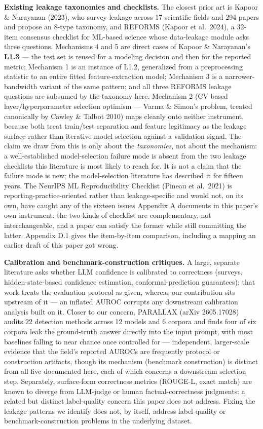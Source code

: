 \documentclass[10pt]{article} %
\begin{document}
\textbf{Existing leakage taxonomies and checklists.} The closest prior art is
Kapoor \& Narayanan (2023), who survey leakage across 17 scientific fields and
294 papers and propose an 8-type taxonomy, and REFORMS (Kapoor et al.\ 2024), a
32-item consensus checklist for ML-based science whose data-leakage module asks
three questions. Mechanisms 4 and 5 are direct cases of Kapoor \& Narayanan's
\textbf{L1.3} --- the test set is reused for a modeling decision and then for
the reported metric; Mechanism 1 is an instance of L1.2, generalized from a
preprocessing statistic to an entire fitted feature-extraction model; Mechanism
3 is a narrower-bandwidth variant of the same pattern; and all three REFORMS
leakage questions are subsumed by the taxonomy here. Mechanism 2 (CV-based
layer/hyperparameter selection optimism --- Varma \& Simon's problem, treated
canonically by Cawley \& Talbot 2010) maps cleanly onto neither instrument,
because both treat train/test separation and feature legitimacy as the leakage
surface rather than iterative model selection against a validation signal. The
claim we draw from this is only about the \emph{taxonomies}, not about the
mechanism: a well-established model-selection failure mode is absent from the
two leakage checklists this literature is most likely to reach for. It is not a
claim that the failure mode is new; the model-selection literature has described
it for fifteen years. The
NeurIPS ML Reproducibility Checklist (Pineau et al.\ 2021) is
reporting-practice-oriented rather than leakage-specific and would not, on its
own, have caught any of the sixteen issues Appendix A documents in this
paper's own instrument: the two kinds of checklist are complementary, not
interchangeable, and a paper can satisfy the former while still committing the
latter. Appendix D.1 gives the item-by-item comparison, including a mapping an
earlier draft of this paper got wrong.

\textbf{Calibration and benchmark-construction critiques.} A large, separate
literature asks whether LLM confidence is calibrated to correctness (surveys,
hidden-state-based confidence estimation, conformal-prediction guarantees);
that work treats the evaluation protocol as given, whereas our contribution sits upstream
of it --- an inflated AUROC corrupts any downstream calibration analysis built
on it. Closer to our concern, PARALLAX (arXiv 2605.17028) audits 22 detection
methods across 12 models and 6 corpora and finds four of six corpora leak the
ground-truth answer directly into the input prompt, with most baselines falling
to near chance once controlled for --- independent, larger-scale evidence that
the field's reported AUROCs are frequently protocol or construction artifacts,
though its mechanism (benchmark construction) is distinct from all five
documented here, each of which concerns a downstream selection step.
Separately, surface-form correctness metrics (ROUGE-L, exact match) are known
to diverge from LLM-judge or human factual-correctness judgments: a related but distinct
label-quality concern this paper does not address. Fixing the leakage patterns
we identify does not, by itself, address label-quality or
benchmark-construction problems in the underlying dataset.
\end{document}
